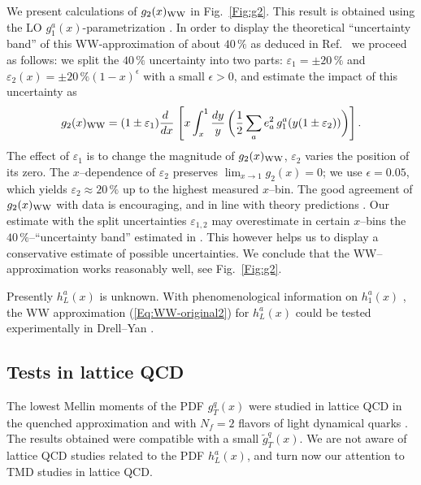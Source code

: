 \documentclass[a4paper,11pt]{article}
\newcommand{\be}{\begin{equation}}
\newcommand{\ee}{\end{equation}}
\begin{document}
We present calculations of $g_2(x)_{\rm WW}$ in Fig.~\ref{Fig:g2}.
This result is obtained using the LO $g_1^a(x)$-parametrization
\cite{Gluck:1998xa}. In order to display the theoretical ``uncertainty
band'' of this WW-approximation of about $40\,\%$ as deduced in
Ref.~\cite{Accardi:2009au} we proceed as follows: we split the
$40\,\%$ uncertainty into two parts: $\varepsilon_1=\pm 20\,\%$ and
$\varepsilon_2(x)=\pm 20\,\%(1-x)^\epsilon$ with a small $\epsilon>0$,
and estimate the impact of this uncertainty as
\be\label{Eq:g2-in-WW-model-violation}
    g_2(x)_{\rm WW} = (1\pm\varepsilon_1)\frac{ d\;}{ d x}\;\Biggl[
    x\int_x^1\frac{ d y}{y} \,\biggl(
    \frac12\sum_ae_a^2\,g_1^a(y(1\pm\varepsilon_2))\biggr)\Biggr]\,.
\ee
The effect of $\varepsilon_1$ is to change the magnitude
of $g_2(x)_{\rm WW}$, $\varepsilon_2$ varies the position of its zero.
The $x$--dependence of $\varepsilon_2$ preserves $\lim_{x\to1}g_2(x)= 0$;
we use $\epsilon=0.05$, which yields $\varepsilon_2\approx 20\,\%$ up to
the highest measured $x$--bin.
The good agreement of $g_2(x)_{\rm WW}$ with data is encouraging,
and in line with theory predictions \cite{Balla:1997hf}.
Our estimate with the split uncertainties
$\varepsilon_{1,2}$ may overestimate in certain $x$--bins the
$40\,\%$--``uncertainty band'' estimated in \cite{Accardi:2009au}.
This however helps us to display a conservative estimate of possible
uncertainties.
We conclude that the WW--approximation works reasonably well,
see Fig.~\ref{Fig:g2}.

Presently $h_L^a(x)$ is unknown.
With phenomenological information on $h_1^a(x)$
\cite{Efremov:2006qm,Anselmino:2007fs,Anselmino:2008jk},
the WW approximation (\ref{Eq:WW-original2}) for $h_L^a(x)$ could
be tested experimentally in Drell--Yan \cite{Koike:2008du}.


\subsection{Tests in lattice QCD}
\label{Sec-3.5:WW-lattice}

The lowest Mellin moments of the PDF $g_T^q(x)$ were studied in
lattice QCD in the quenched approximation \cite{Gockeler:2000ja}
and with $N_f = 2$ flavors of light dynamical quarks \cite{Gockeler:2005vw}.
The results obtained were compatible with a small $\tilde{g}_T^q(x)$.
We are not aware of lattice QCD studies related to the PDF $h_L^a(x)$,
and turn now our attention to TMD studies in lattice QCD.
\end{document}
